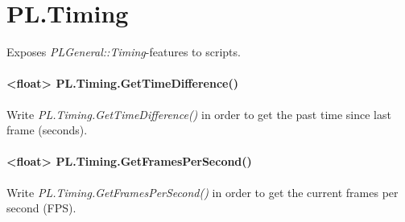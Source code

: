 \section{PL.Timing}
Exposes \emph{PLGeneral::Timing}-features to scripts.


\paragraph{<float> PL.Timing.GetTimeDifference()}
Write \emph{PL.Timing.GetTimeDifference()} in order to get the past time since last frame (seconds).


\paragraph{<float> PL.Timing.GetFramesPerSecond()}
Write \emph{PL.Timing.GetFramesPerSecond()} in order to get the current frames per second (FPS).
